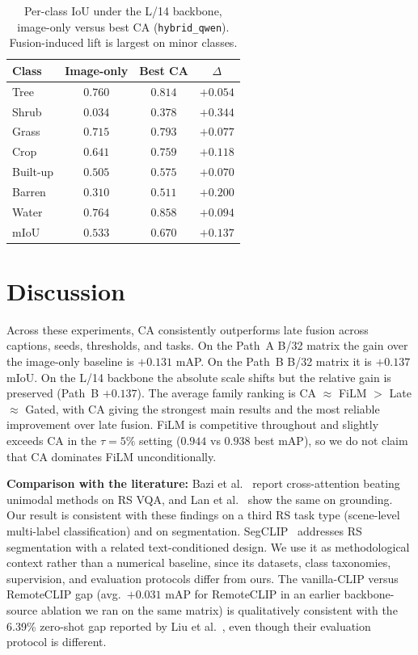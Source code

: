 \documentclass[conference]{IEEEtran}
\begin{document}
\begin{table}[t]
\centering
\caption{\footnotesize Per-class IoU under the L/14 backbone, image-only versus best CA (\texttt{hybrid\_qwen}). Fusion-induced lift is largest on minor classes.}
\label{tab:l14}
\footnotesize
\setlength{\tabcolsep}{4pt}
\renewcommand{\arraystretch}{0.95}
\begin{tabular}{lccc}
\toprule
Class & Image-only & Best CA & $\Delta$ \\
\midrule
Tree     & $0.760$ & $0.814$ & $+0.054$ \\
Shrub    & $0.034$ & $0.378$ & $+0.344$ \\
Grass    & $0.715$ & $0.793$ & $+0.077$ \\
Crop     & $0.641$ & $0.759$ & $+0.118$ \\
Built-up & $0.505$ & $0.575$ & $+0.070$ \\
Barren   & $0.310$ & $0.511$ & $+0.200$ \\
Water    & $0.764$ & $0.858$ & $+0.094$ \\
\midrule
mIoU     & $0.533$ & $0.670$ & $+0.137$ \\
\bottomrule
\end{tabular}
\end{table}

\section{Discussion}

Across these experiments, CA consistently outperforms late fusion across captions, seeds, thresholds, and tasks. On the Path~A B/32 matrix the gain over the image-only baseline is $+0.131$ mAP. On the Path~B B/32 matrix it is $+0.137$ mIoU. On the L/14 backbone the absolute scale shifts but the relative gain is preserved (Path~B $+0.137$). The average family ranking is CA $\approx$ FiLM $>$ Late $\approx$ Gated, with CA giving the strongest main results and the most reliable improvement over late fusion. FiLM is competitive throughout and slightly exceeds CA in the $\tau{=}5\%$ setting ($0.944$ vs $0.938$ best mAP), so we do not claim that CA dominates FiLM unconditionally.

\textbf{Comparison with the literature:} Bazi et al.~\cite{bazi2022bimodal} report cross-attention beating unimodal methods on RS VQA, and Lan et al.~\cite{lan2024grounding} show the same on grounding. Our result is consistent with these findings on a third RS task type (scene-level multi-label classification) and on segmentation. SegCLIP~\cite{zhang2024segclip} addresses RS segmentation with a related text-conditioned design. We use it as methodological context rather than a numerical baseline, since its datasets, class taxonomies, supervision, and evaluation protocols differ from ours. The vanilla-CLIP versus RemoteCLIP gap (avg.\ $+0.031$ mAP for RemoteCLIP in an earlier backbone-source ablation we ran on the same matrix) is qualitatively consistent with the 6.39\% zero-shot gap reported by Liu et al.~\cite{liu2024remoteclip}, even though their evaluation protocol is different.
\end{document}
